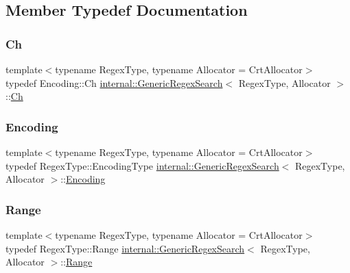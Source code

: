 \subsection{Member Typedef Documentation}
\mbox{\label{classinternal_1_1GenericRegexSearch_a966f3a62fc838b5e9350f4c6a624d9a1}} 
\subsubsection{\texorpdfstring{Ch}{Ch}}
{\footnotesize\ttfamily template$<$typename Regex\+Type, typename Allocator = Crt\+Allocator$>$ \\
typedef Encoding\+::\+Ch \hyperlink{classinternal_1_1GenericRegexSearch}{internal\+::\+Generic\+Regex\+Search}$<$ Regex\+Type, Allocator $>$\+::\hyperlink{classinternal_1_1GenericRegexSearch_a966f3a62fc838b5e9350f4c6a624d9a1}{Ch}}

\mbox{\label{classinternal_1_1GenericRegexSearch_a7b1f81c580c33200c83e1529c2fdbf54}} 
\subsubsection{\texorpdfstring{Encoding}{Encoding}}
{\footnotesize\ttfamily template$<$typename Regex\+Type, typename Allocator = Crt\+Allocator$>$ \\
typedef Regex\+Type\+::\+Encoding\+Type \hyperlink{classinternal_1_1GenericRegexSearch}{internal\+::\+Generic\+Regex\+Search}$<$ Regex\+Type, Allocator $>$\+::\hyperlink{classinternal_1_1GenericRegexSearch_a7b1f81c580c33200c83e1529c2fdbf54}{Encoding}}

\mbox{\label{classinternal_1_1GenericRegexSearch_aaceb6517b628e447c6df61a8b7b33c7c}} 
\subsubsection{\texorpdfstring{Range}{Range}}
{\footnotesize\ttfamily template$<$typename Regex\+Type, typename Allocator = Crt\+Allocator$>$ \\
typedef Regex\+Type\+::\+Range \hyperlink{classinternal_1_1GenericRegexSearch}{internal\+::\+Generic\+Regex\+Search}$<$ Regex\+Type, Allocator $>$\+::\hyperlink{classinternal_1_1GenericRegexSearch_aaceb6517b628e447c6df61a8b7b33c7c}{Range}\hspace{0.3cm}{\ttfamily [private]}}

